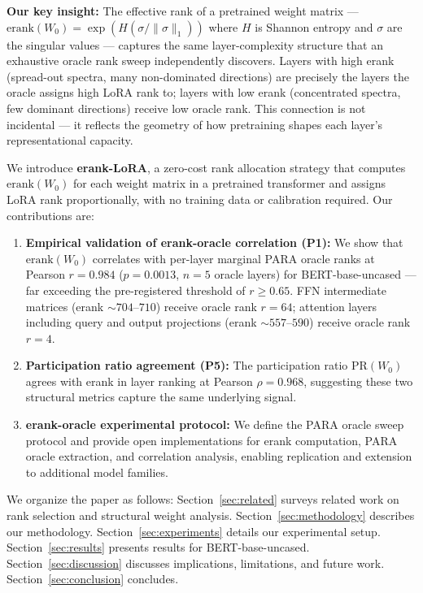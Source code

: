 \textbf{Our key insight:} The effective rank of a pretrained weight matrix --- $\text{erank}(W_0) = \exp(H(\sigma / \|\sigma\|_1))$ where $H$ is Shannon entropy and $\sigma$ are the singular values --- captures the same layer-complexity structure that an exhaustive oracle rank sweep independently discovers. Layers with high erank (spread-out spectra, many non-dominated directions) are precisely the layers the oracle assigns high LoRA rank to; layers with low erank (concentrated spectra, few dominant directions) receive low oracle rank. This connection is not incidental --- it reflects the geometry of how pretraining shapes each layer's representational capacity.

We introduce \textbf{erank-LoRA}, a zero-cost rank allocation strategy that computes $\text{erank}(W_0)$ for each weight matrix in a pretrained transformer and assigns LoRA rank proportionally, with no training data or calibration required. Our contributions are:

\begin{enumerate}
  \item \textbf{Empirical validation of erank-oracle correlation (P1):} We show that $\text{erank}(W_0)$ correlates with per-layer marginal PARA oracle ranks at Pearson $r = 0.984$ ($p = 0.0013$, $n=5$ oracle layers) for BERT-base-uncased --- far exceeding the pre-registered threshold of $r \geq 0.65$. FFN intermediate matrices (erank $\sim 704$--$710$) receive oracle rank $r=64$; attention layers including query and output projections (erank $\sim 557$--$590$) receive oracle rank $r=4$.

  \item \textbf{Participation ratio agreement (P5):} The participation ratio $\text{PR}(W_0)$ agrees with erank in layer ranking at Pearson $\rho = 0.968$, suggesting these two structural metrics capture the same underlying signal.

  \item \textbf{erank-oracle experimental protocol:} We define the PARA oracle sweep protocol and provide open implementations for erank computation, PARA oracle extraction, and correlation analysis, enabling replication and extension to additional model families.
\end{enumerate}

We organize the paper as follows: Section~\ref{sec:related} surveys related work on rank selection and structural weight analysis. Section~\ref{sec:methodology} describes our methodology. Section~\ref{sec:experiments} details our experimental setup. Section~\ref{sec:results} presents results for BERT-base-uncased. Section~\ref{sec:discussion} discusses implications, limitations, and future work. Section~\ref{sec:conclusion} concludes.
